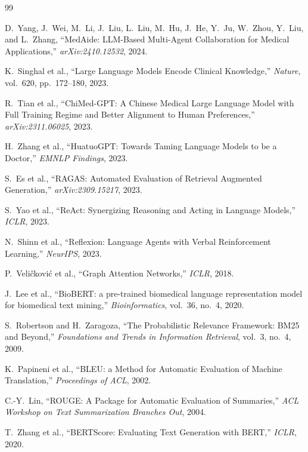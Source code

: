 \documentclass[conference]{IEEEtran}
\begin{document}
\begin{thebibliography}{99}

D.~Yang, J.~Wei, M.~Li, J.~Liu, L.~Liu, M.~Hu, J.~He, Y.~Ju, W.~Zhou, Y.~Liu, and L.~Zhang,
``MedAide: LLM-Based Multi-Agent Collaboration for Medical Applications,''
\textit{arXiv:2410.12532}, 2024.

K.~Singhal et al., ``Large Language Models Encode Clinical Knowledge,''
\textit{Nature}, vol.~620, pp.~172--180, 2023.

R.~Tian et al., ``ChiMed-GPT: A Chinese Medical Large Language Model with
Full Training Regime and Better Alignment to Human Preferences,''
\textit{arXiv:2311.06025}, 2023.

H.~Zhang et al., ``HuatuoGPT: Towards Taming Language Models to be a Doctor,''
\textit{EMNLP Findings}, 2023.

S.~Es et al., ``RAGAS: Automated Evaluation of Retrieval Augmented Generation,''
\textit{arXiv:2309.15217}, 2023.

S.~Yao et al., ``ReAct: Synergizing Reasoning and Acting in Language Models,''
\textit{ICLR}, 2023.

N.~Shinn et al., ``Reflexion: Language Agents with Verbal Reinforcement Learning,''
\textit{NeurIPS}, 2023.

P.~Veli\v{c}kovi\'{c} et al., ``Graph Attention Networks,'' \textit{ICLR}, 2018.

J.~Lee et al., ``BioBERT: a pre-trained biomedical language representation model
for biomedical text mining,'' \textit{Bioinformatics}, vol.~36, no.~4, 2020.

S.~Robertson and H.~Zaragoza, ``The Probabilistic Relevance Framework: BM25 and Beyond,''
\textit{Foundations and Trends in Information Retrieval}, vol.~3, no.~4, 2009.

K.~Papineni et al., ``BLEU: a Method for Automatic Evaluation of Machine Translation,''
\textit{Proceedings of ACL}, 2002.

C.-Y.~Lin, ``ROUGE: A Package for Automatic Evaluation of Summaries,''
\textit{ACL Workshop on Text Summarization Branches Out}, 2004.

T.~Zhang et al., ``BERTScore: Evaluating Text Generation with BERT,''
\textit{ICLR}, 2020.


\end{thebibliography}
\end{document}
